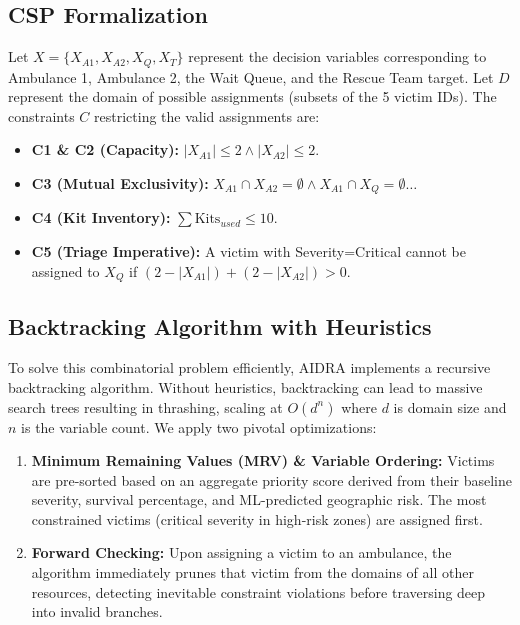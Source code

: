 \documentclass[conference]{IEEEtran}
\begin{document}
\subsection{CSP Formalization}
Let $X = \{X_{A1}, X_{A2}, X_{Q}, X_{T}\}$ represent the decision variables corresponding to Ambulance 1, Ambulance 2, the Wait Queue, and the Rescue Team target.
Let $D$ represent the domain of possible assignments (subsets of the 5 victim IDs).
The constraints $C$ restricting the valid assignments are:
\begin{itemize}
    \item \textbf{C1 \& C2 (Capacity):} $|X_{A1}| \leq 2 \land |X_{A2}| \leq 2$.
    \item \textbf{C3 (Mutual Exclusivity):} $X_{A1} \cap X_{A2} = \emptyset \land X_{A1} \cap X_{Q} = \emptyset \dots$
    \item \textbf{C4 (Kit Inventory):} $\sum \text{Kits}_{used} \leq 10$.
    \item \textbf{C5 (Triage Imperative):} A victim with Severity=Critical cannot be assigned to $X_{Q}$ if $(2 - |X_{A1}|) + (2 - |X_{A2}|) > 0$.
\end{itemize}

\subsection{Backtracking Algorithm with Heuristics}
To solve this combinatorial problem efficiently, AIDRA implements a recursive backtracking algorithm. Without heuristics, backtracking can lead to massive search trees resulting in thrashing, scaling at $O(d^n)$ where $d$ is domain size and $n$ is the variable count. We apply two pivotal optimizations:
\begin{enumerate}
    \item \textbf{Minimum Remaining Values (MRV) \& Variable Ordering:} Victims are pre-sorted based on an aggregate priority score derived from their baseline severity, survival percentage, and ML-predicted geographic risk. The most constrained victims (critical severity in high-risk zones) are assigned first.
    \item \textbf{Forward Checking:} Upon assigning a victim to an ambulance, the algorithm immediately prunes that victim from the domains of all other resources, detecting inevitable constraint violations before traversing deep into invalid branches.
\end{enumerate}
\end{document}
